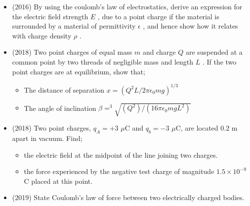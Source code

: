 \documentclass{article}
\begin{document}
\begin{itemize}
\item (2016)  By using the coulomb’s law of electrostatics, derive an expression for the electric field strength $ E$ , due to a point charge if the material is surrounded by a material of permittivity $ \epsilon $ , and hence show how it relates with charge density $ \rho $ .
\item (2018)  Two point charges of equal mass $ m$ and charge $ Q$ are suspended at a common point by two threads of negligible mass and length $ L$ . If the two point charges are at equilibrium,  show that;\begin{itemize}
\item The distance of separation $ x=({Q^{2}L}/{2\pi\epsilon _{0}mg})^{1/3}$
\item The angle of inclination $ \beta = ^{3}\sqrt{(Q^{2})/(16\pi\epsilon _{0}mgL^{2})}$ 
\end{itemize}
\item (2018)  Two point charges, $ q_{A}=+3$ $\mu$C and $ q_{b}=-3$ $\mu$C, are located $ 0.2$ m apart in vacuum. Find; \begin{itemize}
\item the electric field at the midpoint of the line joining two charges. 
\item the force experienced by the negative test charge of magnitude $ 1.5 \times 10^{-9}$ C placed at this point.
\end{itemize}
\item (2019)  State Coulomb’s law of force between two electrically charged bodies. 
\end{itemize}
\end{document}
